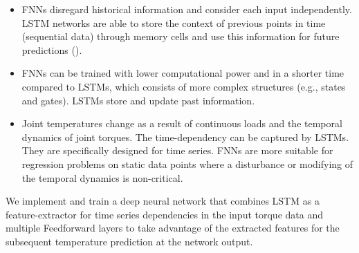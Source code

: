 \documentclass{ifacconf}
\begin{document}
\begin{itemize}
  \item FNNs disregard historical information and consider each input independently.  LSTM networks are able to store the context of previous points in time (sequential data) through memory cells and use this information for future predictions (\cite{Liu}).
  \item FNNs can be trained with lower computational power and in a shorter time compared to LSTMs, which consists of more complex structures (e.g., states and gates). LSTMs store and update past information.
  \item Joint temperatures change as a result of continuous loads and the temporal dynamics of joint torques. The time-dependency can be captured by LSTMs. They are specifically designed for time series. FNNs are more suitable for regression problems on static data points where a disturbance or modifying of the temporal dynamics is non-critical.
\end{itemize}
We implement and train a deep neural network that combines LSTM as a feature-extractor for time series dependencies in the input torque data and multiple Feedforward layers to take advantage of the extracted features for the subsequent temperature prediction at the network output.
\end{document}
